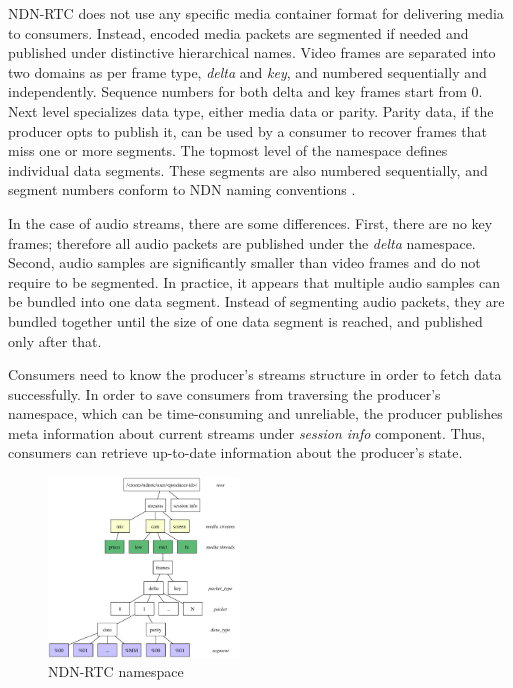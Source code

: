 \documentclass{icn/sig-alternate-2012} %
\newcommand{\ndnrtcName}{NDN-RTC} %
\begin{document}

\ndnrtcName{} does not use any specific media container format for delivering media to consumers. Instead, encoded media packets are segmented if needed and published under distinctive hierarchical names. Video frames are separated into two domains as per frame type, \textit{delta} and \textit{key}, and numbered sequentially and independently. Sequence numbers for both delta and key frames start from 0. Next level specializes data type, either media data or parity. Parity data, if the producer opts to publish it, can be used by a consumer to recover frames that miss one or more segments. The topmost level of the namespace defines individual data segments. These segments are also numbered sequentially, and segment numbers conform to NDN naming conventions \cite{ndn_naming}.

In the case of audio streams, there are some differences. First, there are no key frames; therefore all audio packets are published under the \textit{delta} namespace. Second, audio samples are significantly smaller than video frames and do not require to be segmented. In practice, it appears that multiple audio samples can be bundled into one data segment. Instead of segmenting audio packets, they are bundled together until the size of one data segment is reached, and published only after that.

Consumers need to know the producer's streams structure in order to fetch data successfully. In order to save consumers from traversing the producer's namespace, which can be time-consuming and unreliable, the producer publishes meta information about current streams under \textit{session info} component. Thus, consumers can retrieve up-to-date information about the producer's state.

\begin{figure}[t!]
\centering
\includegraphics[width=0.45\textwidth]{namespace}
\caption{\ndnrtcName{} namespace}
\label{fig:namespace}
\end{figure}
\end{document}
